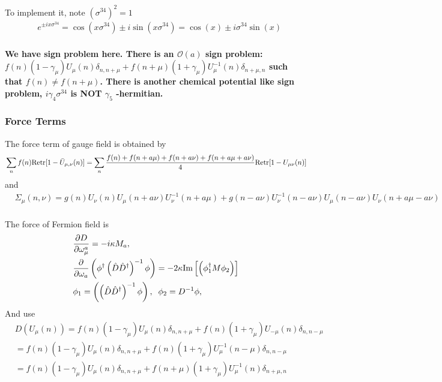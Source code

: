 To implement it, note $(\sigma ^{34})^2=1$
\begin{equation}
\begin{split}
&e^{\pm i x \sigma ^{34}} =\cos (x \sigma ^{34}) \pm i \sin (x\sigma ^{34}) = \cos (x) \pm i \sigma ^{34}\sin (x)\\
\end{split}
\end{equation}

\textbf{\textcolor[rgb]{1,0,0}{We have sign problem here. There is an $\mathcal{O}(a)$ sign problem: $f(n)(1-\gamma _{\mu})U_{\mu}(n)\delta _{n,n+\mu}+f(n+\mu)(1+\gamma _{\mu})U_{\mu}^{-1}(n)\delta _{n+\mu,n}$ such that $f(n)\neq f(n+\mu)$. There is another chemical potential like sign problem, $i\gamma _4 \sigma ^{34}$ is NOT $\gamma _5$ -hermitian.}}

\subsubsection{\label{sec:ForceRigidAcc}Force Terms}

The force term of gauge field is obtained by
\begin{equation}
\begin{split}
&\sum _n f(n){\rm Retr}[1-\bar{U}_{\mu, \nu}(n)]=\sum _n\frac{f(n)+f(n+a\mu)+f(n+a\nu)+f(n+a\mu+a\nu)}{4}{\rm Retr}[1-U_{\mu\nu}(n)]\\
\end{split}
\end{equation}
and
\begin{equation}
\begin{split}
&\Sigma _{\mu}(n,\nu)=g(n)U_{\nu}(n)U_{\mu}(n+a\nu)U^{-1}_{\nu}(n+a\mu)+g(n-a\nu)U^{-1}_{\nu}(n-a\nu)U_{\mu}(n-a\nu)U_{\nu}(n+a\mu-a\nu)\\
\end{split}
\end{equation}

The force of Fermion field is
\begin{equation}
\begin{split}
&\frac{\partial D}{\partial \omega _{\mu}^a}=-i\kappa M_a,\\
&\frac{\partial}{\partial \omega_a} \left(\phi ^{\dagger}\left(\hat{D}\hat{D}^{\dagger}\right)^{-1}\phi\right)=-2\kappa{\rm Im}\left[\left(\phi _1 ^{\dagger} M \phi _2\right)\right]\\
&\phi _1=\left(\left(\hat{D}\hat{D}^{\dagger}\right)^{-1}\phi\right),\;\;
 \phi _2=D^{-1}\phi,\\
\end{split}
\end{equation}
And use
\begin{equation}
\begin{split}
&D(U_{\mu}(n))=f(n)(1-\gamma _{\mu})U_{\mu}(n)\delta _{n,n+\mu}+f(n)(1+\gamma _{\mu})U_{-\mu}(n)\delta _{n,n-\mu}\\
&=f(n)(1-\gamma _{\mu})U_{\mu}(n)\delta _{n,n+\mu}+f(n)(1+\gamma _{\mu})U_{\mu}^{-1}(n-\mu)\delta _{n,n-\mu}\\
&=f(n)(1-\gamma _{\mu})U_{\mu}(n)\delta _{n,n+\mu}+f(n+\mu)(1+\gamma _{\mu})U_{\mu}^{-1}(n)\delta _{n+\mu,n}\\
\end{split}
\end{equation}